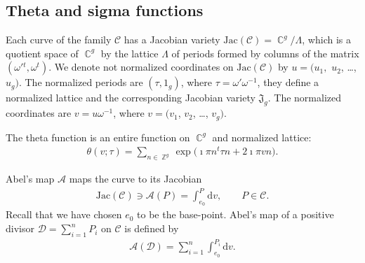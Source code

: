 \documentclass[twoside]{amsart}
\newcommand{\rmd}{\mathrm{d}}
\newcommand{\Jac}{\mathrm{Jac}}
\DeclareMathOperator{\Complex}{\mathbb{C}}
\DeclareMathOperator{\Integer}{\mathbb{Z}}
\theoremstyle{definition}
\theoremstyle{plain}
\begin{document}
\subsection{Theta and sigma functions}\label{ss:ThetaChar}
Each curve of the family $\mathcal{C}$ has a Jacobian variety $\Jac(\mathcal{C})=\Complex^g/ \Lambda$,
which is a quotient space of $\Complex^g$ by the lattice $\Lambda$ 
of periods formed by columns of the matrix $(\omega'{}^t, \omega^t)$.
We denote not normalized coordinates on $\Jac(\mathcal{C})$ by $u=(u_1,$ $u_2$, \ldots, $u_{g})$. 
The  normalized periods are $(\tau, 1_g)$, where $\tau = \omega' \omega^{-1}$,
they define a normalized lattice and the corresponding Jacobian variety $\mathfrak{J}_g$. The 
normalized coordinates  are $v = u \omega^{-1}$, where
$v=(v_1$, $v_2$, \ldots, $v_g)$. 

The theta function is an entire function on $\Complex^g$ and normalized lattice:
\begin{gather}\label{ThetaDef}
 \theta(v;\tau) = \sum_{n\in \Integer^g} \exp \big(\imath \pi n^t \tau n + 2\imath \pi  v n\big).
\end{gather}

Abel's map $\mathcal{A}$ maps the curve to its Jacobian
\begin{gather}\label{AbelM}
 \Jac(\mathcal{C}) \ni \mathcal{A}(P) = \int_{e_0}^P \rmd v,\qquad P\in \mathcal{C}.
\end{gather}
Recall that we have chosen $e_0$ to be the base-point.
Abel's map of a positive divisor $\mathcal{D} = \sum_{i=1}^n P_i$ 
on $\mathcal{C}$ is defined by
\begin{gather}\label{AbelMD}
 \mathcal{A}(\mathcal{D}) = \sum_{i=1}^n 
 \int_{e_0}^{P_i} \rmd v.
\end{gather}
\end{document}
